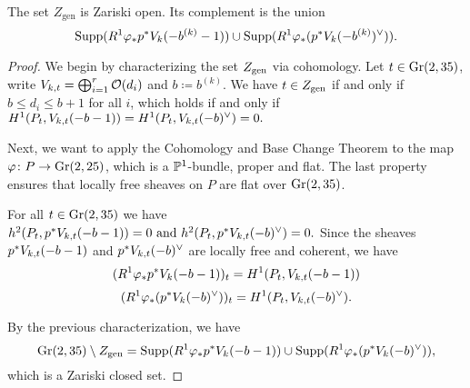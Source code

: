 



\begin{proposition}
	The set $Z_{\text{gen}}$ is Zariski open. Its complement is the union
	\[
		\operatorname{Supp}(R^1 \varphi_{*}p^{*} V_{k}(-b^{(k)}-1)) \cup
		\operatorname{Supp}(R^1 \varphi_{*}(p^{*} V_{k}(-b^{(k)})^\vee)).
	\]
\end{proposition}
\begin{proof}
	We begin by characterizing the set $Z_{\text{gen}}$ via cohomology. Let $t\in \operatorname{Gr}(2,35)$, write $V_{k,t}=\bigoplus_{i=1}^r \mathcal{O}(d_i)$ and $b\coloneqq b^{(k)}$. We have $t\in Z_{\text{gen}}$ if and only if $b\leq d_i \leq b+1$ for all $i$, which holds if and only if
	$
	H^1(P_t, V_{k,t}(-b-1))
	=
	H^1(P_t, V_{k,t}(-b)^\vee)
	=0.
	$

	Next, we want to apply the Cohomology and Base Change Theorem \cite[{}28.1.6]{vakil-algebraic-geometry} to the map 
	$\varphi \colon P \to \operatorname{Gr}(2,25)$, which is a $\mathbb{P}^1$-bundle, proper and flat. The last property ensures that locally free sheaves on $P$ are flat over $\operatorname{Gr}(2,35)$.

	For all $t\in \operatorname{Gr}(2,35)$ we have
	$
	h^2(P_t, p^{*}V_{k,t}(-b-1)) = 0
	\text{ and }
	h^2(P_t,p^{*}V_{k,t}(-b)^\vee)=0.
	$
	Since the sheaves $p^{*}V_{k,t}(-b-1)$ and $p^{*}V_{k,t}(-b)^\vee$ are locally free and coherent, we have 
	\[(R^1 \varphi_{*}p^{*} V_{k}(-b-1))_t = H^1(P_t,V_{k,t}(-b-1))\]
	\[
	(R^1 \varphi_{*}(p^{*} V_{k}(-b)^\vee))_t = H^1(P_t,V_{k,t}(-b)^\vee).
	\]

	By the previous characterization, we have
	\[
		\operatorname{Gr}(2,35) \setminus Z_{\text{gen}} =
		\operatorname{Supp}(R^1 \varphi_{*}p^{*} V_{k}(-b-1)) \cup
		\operatorname{Supp}(R^1 \varphi_{*}(p^{*} V_{k}(-b)^\vee)),
	\]
	which is a Zariski closed set.
\end{proof}

